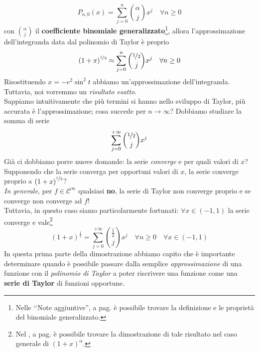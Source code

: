 \begin{equation*}
	P_{n,0}(x)=\sum_{j=0}^{n}\binom{\alpha}{j}x^j\quad\forall n\geq 0
\end{equation*}
con $\displaystyle\binom{\alpha}{j}$ il \textbf{coefficiente binomiale generalizzato}\footnote{Nelle ‘‘Note aggiuntive'', a pag. \pageref{coefficientebinomialgeneralizzato} è possibile trovare la definizione e le proprietà del binomiale generalizzato.}, allora l'approssimazione dell'integranda data dal polinomio di Taylor è proprio
\begin{equation*}
	\left(1+x\right)^{\nicefrac{1}{2}}\approx\sum_{j=0}^{n}\binom{\nicefrac{1}{2}}{j}x^j\quad\forall n\geq 0
\end{equation*}
Risostituendo $x=-e^2\sin^2t$ abbiamo un'approssimazione dell'integranda. Tuttavia, noi vorremmo un \textit{risultato esatto}.\\
Sappiamo intuitivamente che più termini si hanno nello sviluppo di Taylor, più accurata è l'approssimazione; cosa succede per $n\to\infty$? Dobbiamo studiare la somma di serie
\begin{equation*}
	\sum_{j=0}^{+\infty}\binom{\nicefrac{1}{2}}{j}x^j
\end{equation*}
Già ci dobbiamo porre nuove domande: la serie \textit{converge} e per quali valori di $x$? Supponendo che la serie converga per opportuni valori di $x$, la serie converge proprio a $\left(1+x\right)^{\nicefrac{1}{2}}$?\\
\textit{In generale}, per $f\in\mathcal{C}^\infty$ qualsiasi \textbf{no}, la serie di Taylor non converge proprio e se converge non converge ad $f$!\\
Tuttavia, in questo caso siamo particolarmente fortunati: $\forall x\in \left(-1, 1\right)$ la serie converge e vale\footnote{Nel , a pag. \pageref{funzionianaliticheeserie} è possibile trovare la dimostrazione di tale risultato nel caso generale di $\left(1+x\right)^\alpha$.}
\begin{equation*}
	\left(1+x\right)^{\frac{1}{2}}=\sum_{j=0}^{+\infty}\binom{\frac{1}{2}}{j}x^j\quad\forall n\geq 0\quad \forall x\in\left(-1, 1\right)
\end{equation*}
In questa prima parte della dimostrazione abbiamo capito che è importante determinare quando è possibile passare dalla semplice \textit{approssimazione} di una funzione con il \textit{polinomio di Taylor} a poter riscrivere una funzione come una \textbf{serie di Taylor} di funzioni opportune.
